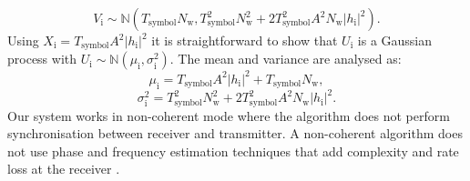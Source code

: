 \documentclass[journal]{IEEEtran}
\begin{document}
\begin{equation}
V_\text{i}\sim \mathbb{N} \left(T_\text{symbol}N_\text{w}, T_\text{symbol}^2 N_\text{w}^2+ 2T_\text{symbol}^2 A^2 N_\text{w} |h_\text{i}|^2  \right).
\label{eq:v}
\end{equation}
Using $X_\text{i} =T_\text{symbol}A^2 |h_\text{i}|^2 $ it is straightforward to show that $U_\text{i}$ is a Gaussian process
with $U_\text{i} \sim \mathbb{N} \left(\mu_\text{i}, \sigma_\text{i}^2 \right)$.
The  mean and variance are analysed as:
%
\begin{equation}
\mu_\text{i}= T_\text{symbol}A^2 |h_\text{i}|^2 +T_\text{symbol}N_\text{w},
\label{eq:m}
\end{equation}
%
\begin{equation}
\sigma_\text{i}^2= T_\text{symbol}^2 N_\text{w}^2+ 2T_\text{symbol}^2 A^2 N_\text{w} |h_\text{i}|^2. 
\label{eq:v}
\end{equation}
%
Our system works in  non-coherent mode 
where the algorithm  does not perform synchronisation between receiver and transmitter. 
%
A non-coherent algorithm does not use phase and frequency estimation techniques that add  complexity  and rate loss at the receiver  \cite{alevizos2016log}. 
%
\end{document}
